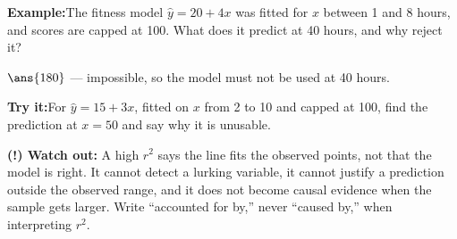 \documentclass[12pt]{article}
\begin{document}
\begin{examplebox}
\textbf{Example:}\quad The fitness model $\hat{y} = 20 + 4x$ was fitted for
$x$ between 1 and 8 hours, and scores are capped at 100. What does it predict at
40 hours, and why reject it?

$\ans{180}$ --- impossible, so the model must not be used at 40 hours.
\end{examplebox}

\begin{tryitbox}
\textbf{Try it:}\quad For $\hat{y} = 15 + 3x$, fitted on $x$ from 2 to 10 and
capped at 100, find the prediction at $x = 50$ and say why it is
unusable.\\[2pt]
\end{tryitbox}

\begin{watchoutbox}
\textbf{(!) Watch out:} A high $r^2$ says the line fits the observed points, not
that the model is right. It cannot detect a lurking variable, it cannot justify
a prediction outside the observed range, and it does not become causal evidence
when the sample gets larger. Write ``accounted for by,'' never ``caused by,''
when interpreting $r^2$.
\end{watchoutbox}
\end{document}
